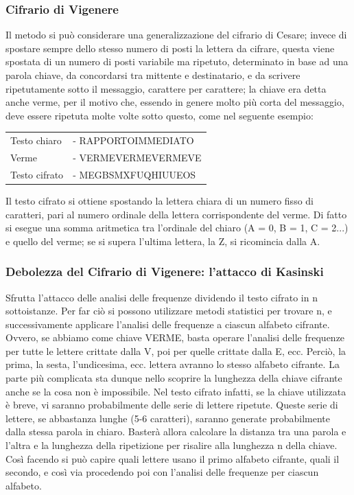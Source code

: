 \documentclass[10pt,a4paper]{article}
\begin{document}
\subsubsection{Cifrario di Vigenere}
Il metodo si può considerare una generalizzazione del cifrario di Cesare; invece di spostare sempre dello stesso numero di posti la lettera da cifrare, questa viene spostata di un numero di posti variabile ma ripetuto, determinato in base ad una parola chiave, da concordarsi tra mittente e destinatario, e da scrivere ripetutamente sotto il messaggio, carattere per carattere; la chiave era detta anche verme, per il motivo che, essendo in genere molto più corta del messaggio, deve essere ripetuta molte volte sotto questo, come nel seguente esempio:\\
\begin{center}
\begin{tabular}{ll}
Testo chiaro &- RAPPORTOIMMEDIATO\\
Verme &- VERMEVERMEVERMEVE\\
Testo cifrato &- MEGBSMXFUQHIUUEOS\\
\end{tabular}
\end{center}
Il testo cifrato si ottiene spostando la lettera chiara di un numero fisso di caratteri, pari al numero ordinale della lettera corrispondente del verme. Di fatto si esegue una somma aritmetica tra l'ordinale del chiaro (A = 0, B = 1, C = 2...) e quello del verme; se si supera l'ultima lettera, la Z, si ricomincia dalla A.

\subsubsection{Debolezza del Cifrario di Vigenere: l'attacco di Kasinski}
Sfrutta l'attacco delle analisi delle frequenze dividendo il testo cifrato in n sottoistanze. Per far ciò si possono utilizzare metodi statistici per trovare n, e successivamente applicare l'analisi delle frequenze a ciascun alfabeto cifrante. Ovvero, se abbiamo come chiave VERME, basta operare l'analisi delle frequenze per tutte le lettere crittate dalla V, poi per quelle crittate dalla E, ecc. Perciò, la prima, la sesta, l'undicesima, ecc. lettera avranno lo stesso alfabeto cifrante. La parte più complicata sta dunque nello scoprire la lunghezza della chiave cifrante anche se la cosa non è impossibile. Nel testo cifrato infatti, se la chiave utilizzata è breve, vi saranno probabilmente delle serie di lettere ripetute. Queste serie di lettere, se abbastanza lunghe (5-6 caratteri), saranno generate probabilmente dalla stessa parola in chiaro. Basterà allora calcolare la distanza tra una parola e l'altra e la lunghezza della ripetizione per risalire alla lunghezza n della chiave. Così facendo si può capire quali lettere usano il primo alfabeto cifrante, quali il secondo, e così via procedendo poi con l'analisi delle frequenze per ciascun alfabeto.
\end{document}
